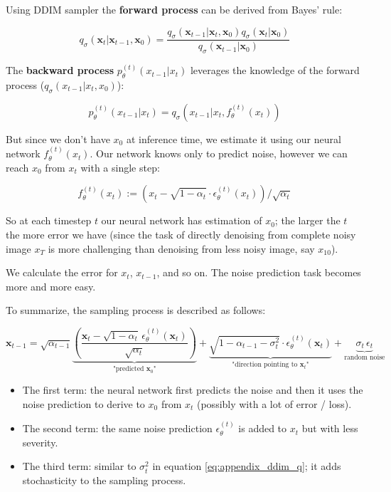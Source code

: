 Using DDIM sampler the \textbf{forward process} can be derived from Bayes' rule:

\[ q_{\sigma}(\mathbf{x}_t | \mathbf{x}_{t-1}, \mathbf{x}_0) = \frac{q_{\sigma}(\mathbf{x}_{t-1} | \mathbf{x}_t, \mathbf{x}_0) q_{\sigma}(\mathbf{x}_t | \mathbf{x}_0)}{q_{\sigma}(\mathbf{x}_{t-1} | \mathbf{x}_0)} \]

The \textbf{backward process} $p_\theta^{(t)} (x_{t-1} | x_t)$ leverages the knowledge of the forward process ($q_\sigma (x_{t-1} | x_t, x_0)$):

\[ p_\theta^{(t)} (x_{t-1} | x_t) = q_\sigma (x_{t-1} | x_t, f_\theta^{(t)} (x_t)) \]

But since we don't have $x_0$ at inference time, we estimate it using our neural network $f_\theta^{(t)} (x_t)$. Our network knows only to predict noise, however we can reach $x_0$ from $x_t$ with a single step:

\[ f_\theta^{(t)} (x_t) := \left( x_t - \sqrt{1 - \alpha_t} \cdot \epsilon_\theta^{(t)} (x_t) \right) / \sqrt{\alpha_t} \]

So at each timestep $t$ our neural network has estimation of $x_0$; the larger the $t$ the more error we have (since the task of directly denoising from complete noisy image $x_T$ is more challenging than denoising from less noisy image, say $x_{10}$).

We calculate the error for $x_t$, $x_{t-1}$, and so on. The noise prediction task becomes more and more easy.

To summarize, the sampling process is described as follows:

\begin{equation}
\mathbf{x}_{t-1} = \sqrt{\alpha_{t-1}} \underbrace{\left( \frac{\mathbf{x}_t - \sqrt{1 - \alpha_t} \, \epsilon_{\theta}^{(t)}(\mathbf{x}_t)}{\sqrt{\alpha_t}} \right)}_{\text{"predicted } \mathbf{x}_0\text{"}} + \underbrace{\sqrt{1 - \alpha_{t-1} - \sigma_t^2} \cdot \epsilon_{\theta}^{(t)}(\mathbf{x}_t)}_{\text{"direction pointing to } \mathbf{x}_t\text{"}} + \underbrace{\sigma_t \, \epsilon_t}_{\text{random noise}}
\end{equation}

\begin{itemize}
    \item The first term: the neural network first predicts the noise and then it uses the noise prediction to derive to $x_0$ from $x_t$ (possibly with a lot of error / loss).
    \item The second term: the same noise prediction $\epsilon_{\theta}^{(t)}$ is added to $x_t$ but with less severity.
    \item The third term: similar to $\sigma_t^2$ in equation \ref{eq:appendix_ddim_q}; it adds stochasticity to the sampling process.
\end{itemize}











